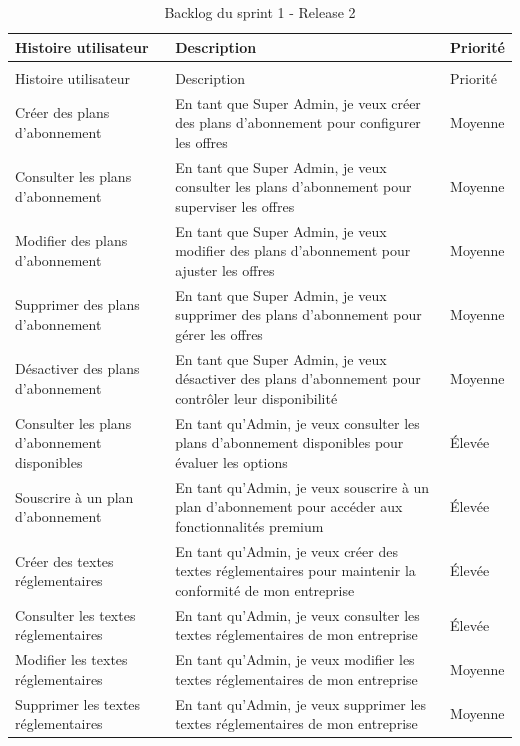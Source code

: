 \begin{longtable}{|>{\raggedright\arraybackslash}p{4cm}|>{\raggedright\arraybackslash}p{7cm}|>{\raggedright\arraybackslash}p{2cm}|}
\caption{Backlog du sprint 1 - Release 2}
\label{tab:sprint1_release2_backlog}\\
\hline
Histoire utilisateur & Description & Priorité \\
\hline
\endfirsthead
\multicolumn{3}{c}{\tablename\ \thetable\ -- suite} \\
\hline
Histoire utilisateur & Description & Priorité \\
\hline
\endhead
Créer des plans d'abonnement & En tant que Super Admin, je veux créer des plans d'abonnement pour configurer les offres & Moyenne \\
\hline
Consulter les plans d'abonnement & En tant que Super Admin, je veux consulter les plans d'abonnement pour superviser les offres & Moyenne \\
\hline
Modifier des plans d'abonnement & En tant que Super Admin, je veux modifier des plans d'abonnement pour ajuster les offres & Moyenne \\
\hline
Supprimer des plans d'abonnement & En tant que Super Admin, je veux supprimer des plans d'abonnement pour gérer les offres & Moyenne \\
\hline
Désactiver des plans d'abonnement & En tant que Super Admin, je veux désactiver des plans d'abonnement pour contrôler leur disponibilité & Moyenne \\
\hline
Consulter les plans d'abonnement disponibles & En tant qu'Admin, je veux consulter les plans d'abonnement disponibles pour évaluer les options & Élevée \\
\hline
Souscrire à un plan d'abonnement & En tant qu'Admin, je veux souscrire à un plan d'abonnement pour accéder aux fonctionnalités premium & Élevée \\
\hline
Créer des textes réglementaires & En tant qu'Admin, je veux créer des textes réglementaires pour maintenir la conformité de mon entreprise & Élevée \\
\hline
Consulter les textes réglementaires & En tant qu'Admin, je veux consulter les textes réglementaires de mon entreprise & Élevée \\
\hline
Modifier les textes réglementaires & En tant qu'Admin, je veux modifier les textes réglementaires de mon entreprise & Moyenne \\
\hline
Supprimer les textes réglementaires & En tant qu'Admin, je veux supprimer les textes réglementaires de mon entreprise & Moyenne \\

\end{longtable}
